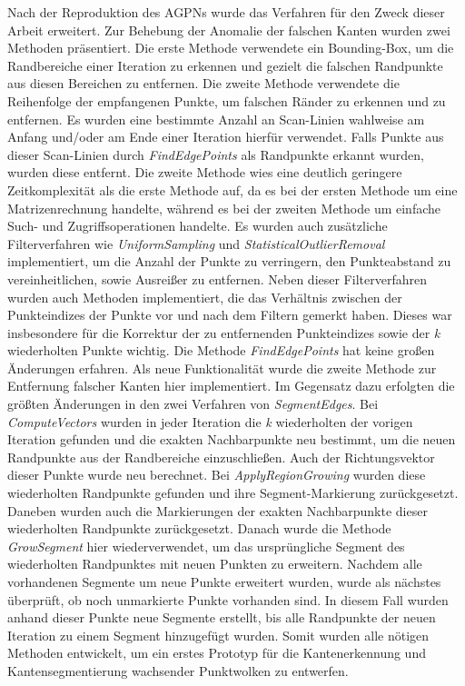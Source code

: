 Nach der Reproduktion des AGPNs wurde das Verfahren für den Zweck dieser Arbeit erweitert. Zur Behebung der Anomalie der falschen Kanten wurden zwei Methoden präsentiert. Die erste Methode verwendete ein Bounding-Box, um die Randbereiche einer Iteration zu erkennen und gezielt die falschen Randpunkte aus diesen Bereichen zu entfernen. Die zweite Methode verwendete die Reihenfolge der empfangenen Punkte, um falschen Ränder zu erkennen und zu entfernen. Es wurden eine bestimmte Anzahl an Scan-Linien wahlweise am Anfang und/oder am Ende einer Iteration hierfür verwendet. Falls Punkte aus dieser Scan-Linien durch \textit{FindEdgePoints} als Randpunkte erkannt wurden, wurden diese entfernt. Die zweite Methode wies eine deutlich geringere Zeitkomplexität als die erste Methode auf, da es bei der ersten Methode um eine Matrizenrechnung handelte, während es bei der zweiten Methode um einfache Such- und Zugriffsoperationen handelte. Es wurden auch zusätzliche Filterverfahren wie \textit{UniformSampling} und \textit{StatisticalOutlierRemoval} implementiert, um die Anzahl der Punkte zu verringern, den Punkteabstand zu vereinheitlichen, sowie Ausreißer zu entfernen. Neben dieser Filterverfahren wurden auch Methoden implementiert, die das Verhältnis zwischen der Punkteindizes der Punkte vor und nach dem Filtern gemerkt haben. Dieses war insbesondere für die Korrektur der zu entfernenden Punkteindizes sowie der \textit{k} wiederholten Punkte wichtig. Die Methode \textit{FindEdgePoints} hat keine großen Änderungen erfahren. Als neue Funktionalität wurde die zweite Methode zur Entfernung falscher Kanten hier implementiert. Im Gegensatz dazu erfolgten die größten Änderungen in den zwei Verfahren von \textit{SegmentEdges}. Bei \textit{ComputeVectors} wurden in jeder Iteration die \textit{k} wiederholten der vorigen Iteration gefunden und die exakten Nachbarpunkte neu bestimmt, um die neuen Randpunkte aus der Randbereiche einzuschließen. Auch der Richtungsvektor dieser Punkte wurde neu berechnet. Bei \textit{ApplyRegionGrowing} wurden diese wiederholten Randpunkte gefunden und ihre Segment-Markierung zurückgesetzt. Daneben wurden auch die Markierungen der exakten Nachbarpunkte dieser wiederholten Randpunkte zurückgesetzt. Danach wurde die Methode \textit{GrowSegment} hier wiederverwendet, um das ursprüngliche Segment des wiederholten Randpunktes mit neuen Punkten zu erweitern. Nachdem alle vorhandenen Segmente um neue Punkte erweitert wurden, wurde als nächstes überprüft, ob noch unmarkierte Punkte vorhanden sind. In diesem Fall wurden anhand dieser Punkte neue Segmente erstellt, bis alle Randpunkte der neuen Iteration zu einem Segment hinzugefügt wurden. Somit wurden alle nötigen Methoden entwickelt, um ein erstes Prototyp für die Kantenerkennung und Kantensegmentierung wachsender Punktwolken zu entwerfen.

